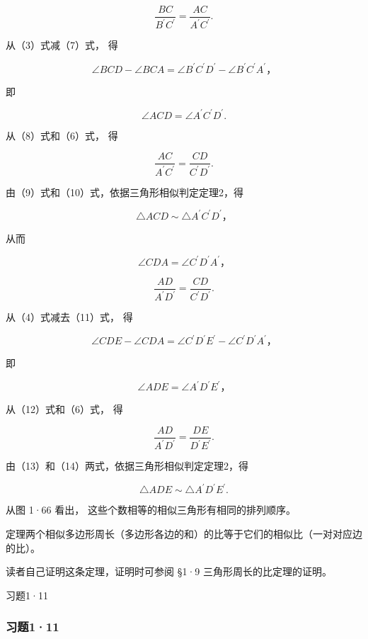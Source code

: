 \[
\frac {B C}{B ^ {\prime} C ^ {\prime}} = \frac {A C}{A ^ {\prime} C ^ {\prime}}. \tag {8}
\]

从（3）式减（7）式， 得

\[
\angle B C D - \angle B C A = \angle B ^ {\prime} C ^ {\prime} D ^ {\prime} - \angle B ^ {\prime} C ^ {\prime} A ^ {\prime}\text{，}
\]

即

\[
\angle A C D = \angle A ^ {\prime} C ^ {\prime} D ^ {\prime}. \tag {9}
\]

从（8）式和（6）式， 得

\[
\frac {A C}{A ^ {\prime} C ^ {\prime}} = \frac {C D}{C ^ {\prime} D ^ {\prime}}. \tag {10}
\]

由（9）式和（10）式，依据三角形相似判定定理2，得

\[
\triangle A C D \sim \triangle A ^ {\prime} C ^ {\prime} D ^ {\prime}\text{，}
\]

从而

\[
\angle C D A = \angle C ^ {\prime} D ^ {\prime} A ^ {\prime}\text{，} \tag {11}
\]

\[
\frac {A D}{A ^ {\prime} D ^ {\prime}} = \frac {C D}{C ^ {\prime} D ^ {\prime}}. \tag {12}
\]

从（4）式减去（11）式， 得

\[
\angle C D E - \angle C D A = \angle C ^ {\prime} D ^ {\prime} E ^ {\prime} - \angle C ^ {\prime} D ^ {\prime} A ^ {\prime}\text{，}
\]

即

\[
\angle A D E = \angle A ^ {\prime} D ^ {\prime} E ^ {\prime}\text{，} \tag {13}
\]

从（12）式和（6）式， 得

\[
\frac {A D}{A ^ {\prime} D ^ {\prime}} = \frac {D E}{D ^ {\prime} E ^ {\prime}}. \tag {14}
\]

由（13）和（14）两式，依据三角形相似判定定理2，得

\[
\triangle A D E \sim \triangle A ^ {\prime} D ^ {\prime} E ^ {\prime}.
\]

从图 1·66 看出， 这些个数相等的相似三角形有相同的排列顺序。

定理两个相似多边形周长（多边形各边的和）的比等于它们的相似比（一对对应边的比）。

读者自己证明这条定理，证明时可参阅 §1·9 三角形周长的比定理的证明。

习题1·11

\subsubsection{习题1·11}

